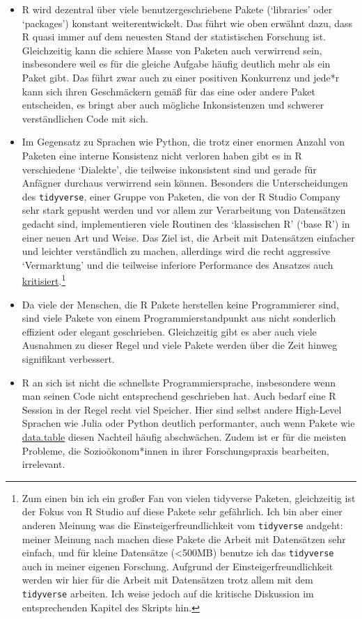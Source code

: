 \documentclass[]{tufte-book}
\begin{document}
\begin{itemize}
\item
  R wird dezentral über viele benutzergeschriebene Pakete (`libraries'
  oder `packages') konstant weiterentwickelt. Das führt wie oben erwähnt
  dazu, dass R quasi immer auf dem neuesten Stand der statistischen
  Forschung ist. Gleichzeitig kann die schiere Masse von Paketen auch
  verwirrend sein, insbesondere weil es für die gleiche Aufgabe häufig
  deutlich mehr als ein Paket gibt. Das führt zwar auch zu einer
  positiven Konkurrenz und jede*r kann sich ihren Geschmäckern gemäß für
  das eine oder andere Paket entscheiden, es bringt aber auch mögliche
  Inkonsistenzen und schwerer verständlichen Code mit sich.
\item
  Im Gegensatz zu Sprachen wie Python, die trotz einer enormen Anzahl
  von Paketen eine interne Konsistenz nicht verloren haben gibt es in R
  verschiedene `Dialekte', die teilweise inkonsistent sind und gerade
  für Anfägner durchaus verwirrend sein können. Besonders die
  Unterscheidungen des \texttt{tidyverse}, einer Gruppe von Paketen, die
  von der R Studio Company sehr stark gepusht werden und vor allem zur
  Verarbeitung von Datensätzen gedacht sind, implementieren viele
  Routinen des `klassischen R' (`base R') in einer neuen Art und Weise.
  Das Ziel ist, die Arbeit mit Datensätzen einfacher und leichter
  verständlich zu machen, allerdings wird die recht aggressive
  `Vermarktung' und die teilweise inferiore Performance des Ansatzes
  auch
  \href{https://github.com/matloff/TidyverseSkeptic}{kritisiert}.\footnote{Zum
    einen bin ich ein großer Fan von vielen tidyverse Paketen,
    gleichzeitig ist der Fokus von R Studio auf diese Pakete sehr
    gefährlich. Ich bin aber einer anderen Meinung was die
    Einsteigerfreundlichkeit vom \texttt{tidyverse} andgeht: meiner
    Meinung nach machen diese Pakete die Arbeit mit Datensätzen sehr
    einfach, und für kleine Datensätze (\textless{}500MB) benutze ich
    das \texttt{tidyverse} auch in meiner eigenen Forschung. Aufgrund
    der Einsteigerfreundlichkeit werden wir hier für die Arbeit mit
    Datensätzen trotz allem mit dem \texttt{tidyverse} arbeiten. Ich
    weise jedoch auf die kritische Diskussion im entsprechenden Kapitel
    des Skripts hin.}
\item
  Da viele der Menschen, die R Pakete herstellen keine Programmierer
  sind, sind viele Pakete von einem Programmierstandpunkt aus nicht
  sonderlich effizient oder elegant geschrieben. Gleichzeitig gibt es
  aber auch viele Ausnahmen zu dieser Regel und viele Pakete werden über
  die Zeit hinweg signifikant verbessert.
\item
  R an sich ist nicht die schnellste Programmiersprache, insbesondere
  wenn man seinen Code nicht entsprechend geschrieben hat. Auch bedarf
  eine R Session in der Regel recht viel Speicher. Hier sind selbst
  andere High-Level Sprachen wie Julia oder Python deutlich
  performanter, auch wenn Pakete wie
  \href{https://rdatatable.gitlab.io/data.table/}{data.table} diesen
  Nachteil häufig abschwächen. Zudem ist er für die meisten Probleme,
  die Sozioökonom*innen in ihrer Forschungspraxis bearbeiten,
  irrelevant.
\end{itemize}
\end{document}

